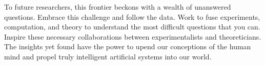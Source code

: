 \documentclass[../main.tex]{subfiles}
\begin{document}
To future researchers, this frontier beckons with a wealth of unanswered questions. Embrace this challenge and follow the data. Work to fuse experiments, computation, and theory to understand the most difficult questions that you can. Inspire these necessary collaborations between experimentalists and theoreticians. The insights yet found have the power to upend our conceptions of the human mind and propel truly intelligent artificial systems into our world.























\end{document}
